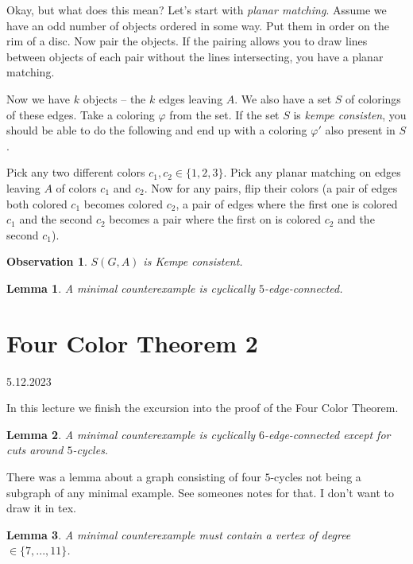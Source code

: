\documentclass{article}
\newtheorem*{lemma}{Lemma}
\newtheorem*{observation}{Observation}
\begin{document}
\noindent
Okay, but what does this mean? Let's start with \emph{planar matching}. Assume
we have an odd number of objects ordered in some way. Put them in order on the
rim of a disc. Now pair the objects. If the pairing allows you to draw lines
between objects of each pair without the lines intersecting, you have a planar
matching.

Now we have $k$ objects -- the $k$ edges leaving $A$. We also
have a set $S$ of colorings of these edges. Take a coloring $\varphi$
from the set. If the set $S$ is \emph{kempe consisten}, you should be able to
do the following and end up with a coloring $\varphi'$ also present in $S$.

Pick any two different colors $c_1,c_2 \in \{1,2,3\}$. Pick any planar matching
on edges leaving $A$ of colors $c_1$ and $c_2$. Now for any pairs, flip their
colors (a pair of edges both colored $c_1$ becomes colored $c_2$, a pair of
edges where the first one is colored $c_1$ and the second $c_2$ becomes a pair
where the first on is colored $c_2$ and the second $c_1$).

\begin{observation}
	$S(G, A)$ is Kempe consistent.
\end{observation}

\begin{lemma}
	A minimal counterexample is cyclically $5$-edge-connected.
\end{lemma}


\newpage
\section{Four Color Theorem 2} %
5.12.2023

\noindent
In this lecture we finish the excursion into the proof of the Four Color
Theorem.

\begin{lemma}
	A minimal counterexample is cyclically $6$-edge-connected except for
	cuts around $5$-cycles.
\end{lemma}

\noindent
There was a lemma about a graph consisting of four $5$-cycles not being a
subgraph of any minimal example. See someones notes for that. I don't want to
draw it in tex.

\begin{lemma}
	A minimal counterexample must contain a vertex of degree $\in \{7, ...,
	11\}$.
\end{lemma}
\end{document}
